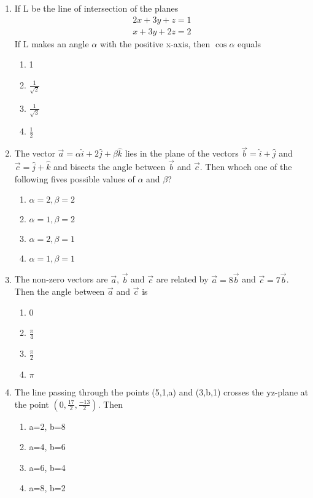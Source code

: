 \begin{enumerate}[label=\arabic*.,ref=\thesubsection.\theenumi]
\item If L be the line of intersection of the planes 
\begin{align*}
2x+3y+z=1
\end{align*}
\begin{align*}
x+3y+2z=2
\end{align*}
If L makes an angle $\alpha$ with the positive x-axis, then $\cos\alpha$ equals
\begin{enumerate}
\item 1
\item $\frac{1}{\sqrt{2}}$
\item $\frac{1}{\sqrt{3}}$
\item $\frac{1}{2}$
\end{enumerate}

\item The vector $\overrightarrow{a}=\alpha\hat{i}+2\hat{j}+\beta\hat{k}$ lies in the plane of the vectors $\overrightarrow{b}=\hat{i}+\hat{j}$ and $\overrightarrow{c}=\hat{j}+\hat{k}$ and bisects the angle between $\overrightarrow{b}$ and $\overrightarrow{c}$. Then whoch one of the following fives possible values of $\alpha$ and $\beta$?
\begin{enumerate}
\item $\alpha=2, \beta=2$
\item $\alpha=1, \beta=2$
\item $\alpha=2, \beta=1$
\item $\alpha=1, \beta=1$
\end{enumerate}

\item The non-zero vectors are $\overrightarrow{a}$, $\overrightarrow{b}$ and $\overrightarrow{c}$ are related by $\overrightarrow{a}=8\overrightarrow{b}$ and $\overrightarrow{c}=7\overrightarrow{b}$. Then the angle between $\overrightarrow{a}$ and $\overrightarrow{c}$ is
\begin{enumerate}
\item 0
\item $\frac{\pi}{4}$
\item $\frac{\pi}{2}$
\item $\pi$
\end{enumerate}

\item The line passing through the points (5,1,a) and (3,b,1) crosses the yz-plane at the point $(0,\frac{17}{2},\frac{-13}{2})$. Then
\begin{enumerate}
\item a=2, b=8
\item a=4, b=6
\item a=6, b=4
\item a=8, b=2
\end{enumerate}


\end{enumerate}
